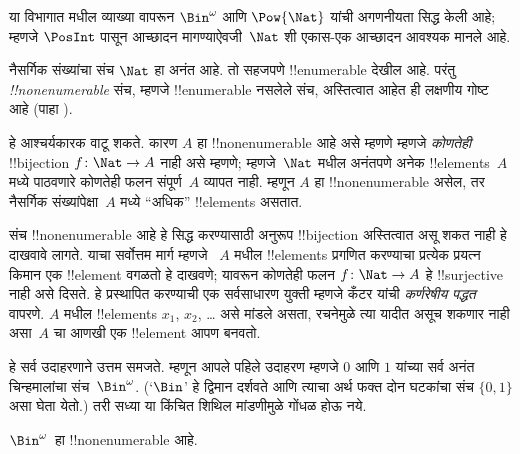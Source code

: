 \documentclass[../../../include/open-logic-section]{subfiles}
\begin{document}


\begin{editorial}
  या विभागात  मधील व्याख्या वापरून
  $\Bin^\omega$ आणि $\Pow{\Nat}$ यांची अगणनीयता सिद्ध केली आहे;
  म्हणजे $\PosInt$ पासून आच्छादन मागण्याऐवजी~$\Nat$ शी एकास-एक
  आच्छादन आवश्यक मानले आहे.
\end{editorial}

\begin{explain}
नैसर्गिक संख्यांचा संच $\Nat$ हा अनंत आहे. तो सहजपणे
!!{enumerable} देखील आहे. परंतु
\emph{!!{nonenumerable}} संच, म्हणजे !!{enumerable} नसलेले संच,
अस्तित्वात आहेत ही लक्षणीय गोष्ट आहे
(पाहा ).

हे आश्चर्यकारक वाटू शकते. कारण $A$ हा !!{nonenumerable} आहे असे
म्हणणे म्हणजे \emph{कोणतेही} !!{bijection} $f \colon \Nat \to A$
नाही असे म्हणणे; म्हणजे~$\Nat$ मधील अनंतपणे अनेक !!{element}s~$A$
मध्ये पाठवणारे कोणतेही फलन संपूर्ण~$A$ व्यापत नाही. म्हणून $A$ हा
!!{nonenumerable} असेल, तर नैसर्गिक संख्यांपेक्षा~$A$ मध्ये ``अधिक''
!!{element}s असतात.

संच !!{nonenumerable} आहे हे सिद्ध करण्यासाठी अनुरूप !!{bijection}
अस्तित्वात असू शकत नाही हे दाखवावे लागते. याचा सर्वोत्तम मार्ग म्हणजे
~$A$ मधील !!{element}s प्रगणित करण्याचा प्रत्येक प्रयत्न किमान एक
!!{element} वगळतो हे दाखवणे; यावरून कोणतेही फलन $f\colon \Nat \to A$
हे !!{surjective} नाही असे दिसते. हे प्रस्थापित करण्याची एक सर्वसाधारण
युक्ती म्हणजे कँटर यांची \emph{कर्णरेषीय पद्धत} वापरणे. $A$ मधील
!!{element}s $x_1$, $x_2$, \dots{} असे मांडले असता, रचनेमुळे त्या
यादीत असूच शकणार नाही असा~$A$ चा आणखी एक !!{element} आपण बनवतो.

हे सर्व उदाहरणाने उत्तम समजते. म्हणून आपले पहिले उदाहरण म्हणजे $0$
आणि $1$ यांच्या सर्व अनंत चिन्हमालांचा संच~$\Bin^\omega$. (`$\Bin$'
हे द्विमान दर्शवते आणि त्याचा अर्थ फक्त दोन घटकांचा संच $\{0,1\}$
असा घेता येतो.)
तरी सध्या या किंचित शिथिल मांडणीमुळे गोंधळ होऊ नये.
\end{explain}

\begin{thm}
$\Bin^\omega$~हा !!{nonenumerable} आहे.
\end{thm}
\end{document}
